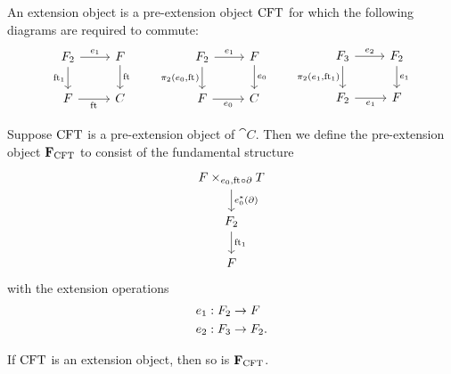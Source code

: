 \begin{defn} An extension object is a pre-extension object $\mathrm{CFT}$ for which 
the following diagrams are required to commute:
\begin{equation*}
\begin{tikzcd}
\stesysf_2 
  \ar{r}{\efamext} 
  \ar{d}[swap]{\eft[1]} 
  & 
\stesysf 
  \ar{d}{\eft}
  \\
\stesysf
  \ar{r}[swap]{\eft} 
  & 
\stesysc
\end{tikzcd}
\qquad
\begin{tikzcd}
\stesysf_2 
  \ar{d}[swap]{\pullbackpr{2}{\ectxext}{\eft}} 
  \ar{r}{\efamext} 
  & 
\stesysf 
  \ar{d}{\ectxext}
  \\
\stesysf 
  \ar{r}[swap]{\ectxext} 
  & 
\stesysc
\end{tikzcd}
\qquad
\begin{tikzcd}
\stesysf_3
  \ar{d}[swap]{\pullbackpr{2}{\efamext}{\eft[1]}}
  \ar{r}{\eext{2}}
  & 
\stesysf_2 
  \ar{d}{\efamext} 
  \\
\stesysf_2 
  \ar{r}[swap]{\efamext} 
  &
\stesysf
\end{tikzcd}
\end{equation*}
\end{defn}

\begin{defn}
Suppose $\mathrm{CFT}$ is a pre-extension object of $\cat{C}$. Then we define the pre-extension object
$\mathbf{F}_{\mathrm{CFT}}$ to consist of the fundamental structure
\begin{equation*}
\begin{tikzcd}
\pullback{\stesysf}{\stesyst}{\ectxext}{\eft\circ\ebd}
  \ar{d}{\ectxext^\ast(\ebd)}
  \\
\stesysf_2
  \ar{d}{\eft[1]}
  \\
\stesysf
\end{tikzcd}
\end{equation*}
with the extension operations
\begin{align*}
e_{1} 
  & 
  : F_2\to F\\
e_{2} & : F_3\to F_2.
\end{align*}
\end{defn}

\begin{lem}
If $\mathrm{CFT}$ is an extension object, then so is $\mathbf{F}_{\mathrm{CFT}}$.
\end{lem}

